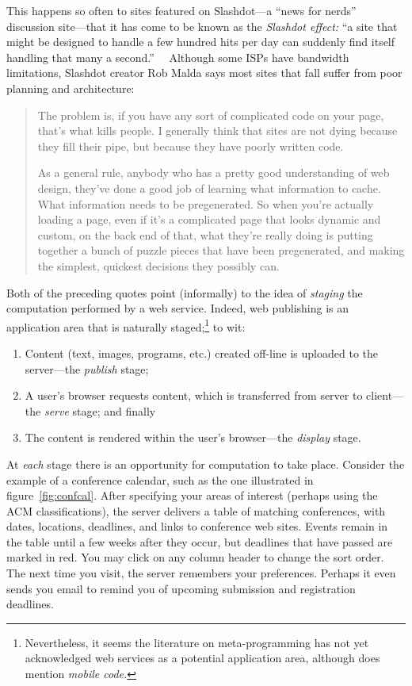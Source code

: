 \documentclass[preprint]{acm_proc_article-sp}
\begin{document}
This happens so often to sites featured on Slashdot---a
``news for nerds'' discussion site---that it has come to be
known as the \emph{Slashdot effect:} ``a site that might be
designed to handle a few hundred hits per day can suddenly
find itself handling that many a
second.''~\cite{turner03slashdot}~ Although some ISPs have
bandwidth limitations, Slashdot creator Rob Malda says most
sites that fall suffer from poor planning and architecture:
\begin{quote}
  The problem is, if you have any sort of complicated code
  on your page, that’s what kills people. I generally think
  that sites are not dying because they fill their pipe, but
  because they have poorly written code.
  
  As a general rule, anybody who has a pretty good
  understanding of web design, they’ve done a good job of
  learning what information to cache. What information needs
  to be pregenerated. So when you’re actually loading a
  page, even if it’s a complicated page that looks dynamic
  and custom, on the back end of that, what they’re really
  doing is putting together a bunch of puzzle pieces that
  have been pregenerated, and making the simplest, quickest
  decisions they possibly can.~\cite{turner03slashdot}
\end{quote}

Both of the preceding quotes point (informally) to the idea
of \emph{staging} the computation performed by a web
service.  Indeed, web publishing is an application area that
is naturally staged;\footnote{Nevertheless, it seems the
  literature on meta-programming has not yet acknowledged
  web services as a potential application area, although
  \citet{sheard01accomp} does
  mention \emph{mobile code.}} %
to wit:
\begin{enumerate}
\item Content (text, images, programs, etc.) created
  off-line is uploaded to the server---the \emph{publish}
  stage;
  
\item A user's browser requests content, which is
  transferred from server to client---the \emph{serve}
  stage; and finally
  
\item The content is rendered within the user's
  browser---the \emph{display} stage.
\end{enumerate}
At \emph{each} stage there is an opportunity for computation
to take place.  Consider the example of a conference
calendar, such as the one illustrated in
figure~\ref{fig:confcal}.  After specifying your areas of
interest (perhaps using the ACM classifications), the server
delivers a table of matching conferences, with dates,
locations, deadlines, and links to conference web sites.
Events remain in the table until a few weeks after they
occur, but deadlines that have passed are marked in red.
You may click on any column header to change the sort order.
The next time you visit, the server remembers your
preferences.  Perhaps it even sends you email to remind you
of upcoming submission and registration deadlines.
\end{document}
